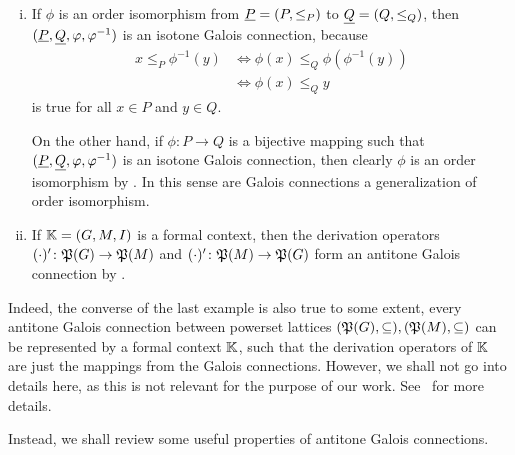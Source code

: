 \begin{Example}
  \begin{enumerate}[i. ]
  \item If $\phi$ is an order isomorphism from ${\underline{P}} = (P, \leq_P)$ to ${\underline{Q}} = (Q,
    \leq_Q)$, then $({\underline{P}}, {\underline{Q}}, \varphi, \varphi^{-1})$ is an isotone Galois connection,
    because
    \begin{align*}
      x \leq_P \phi^{-1}(y)
      &\iff \phi(x) \leq_Q \phi(\phi^{-1}(y))\\
      &\iff \phi(x) \leq_Q y
    \end{align*}
    is true for all $x \in P$ and $y \in Q$.

    On the other hand, if $\phi \colon P \to Q$ is a bijective mapping such that $({\underline{P}},
    {\underline{Q}}, \varphi, \varphi^{-1})$ is an isotone Galois connection, then clearly $\phi$ is an
    order isomorphism by .  In this sense are
    Galois connections a generalization of order isomorphism.
  \item If ${\mathbb{K}} = (G, M, I)$ is a formal context, then the derivation operators
    $(\cdot)' \colon {\ensuremath{\mathfrak{P}(G)}} \to {\ensuremath{\mathfrak{P}(M)}}$ and $(\cdot)' \colon {\ensuremath{\mathfrak{P}(M)}} \to
    {\ensuremath{\mathfrak{P}(G)}}$ form an antitone Galois connection by
    .
  \end{enumerate}
\end{Example}

Indeed, the converse of the last example is also true to some extent, \ie every antitone
Galois connection between powerset lattices $({\mathfrak{P}(G)}, \subseteq), ({\mathfrak{P}(M)},
\subseteq)$ can be represented by a formal context ${\mathbb{K}}$, such that the derivation
operators of ${\mathbb{K}}$ are just the mappings from the Galois connections.  However, we
shall not go into details here, as this is not relevant for the purpose of our work.
See~\cite{fca-book} for more details.

Instead, we shall review some useful properties of antitone Galois connections.

